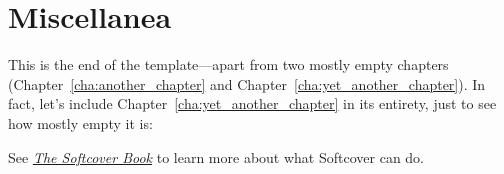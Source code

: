 \section{Miscellanea}

This is the end of the template---apart from two mostly empty chapters (Chapter~\ref{cha:another_chapter} and Chapter~\ref{cha:yet_another_chapter}). In fact, let's include Chapter~\ref{cha:yet_another_chapter} in its entirety, just to see how mostly empty it is:


See \href{http://manual.softcover.org/book}{\emph{The Softcover Book}} to learn more about what Softcover can do.
